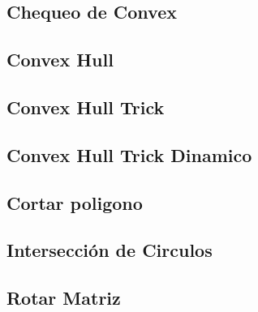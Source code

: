 \subsection{Chequeo de Convex}


\subsection{Convex Hull}


\newpage
\subsection{Convex Hull Trick}


\subsection{Convex Hull Trick Dinamico}


\subsection{Cortar poligono}


\subsection{Intersecci\'on de Circulos}


\subsection{Rotar Matriz}

